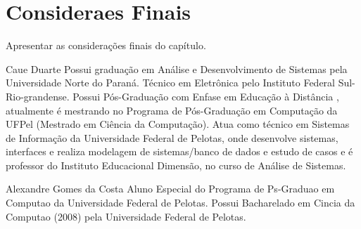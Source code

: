 \documentclass[12pt,a4paper,compsoc]{IEEEtran}
\begin{document}
\section{Consideraes Finais}

Apresentar as considerações finais do capítulo.






\begin{IEEEbiography}{Caue Duarte}
Possui graduação em Análise e Desenvolvimento de Sistemas pela Universidade Norte do Paraná. Técnico em Eletrônica pelo Instituto Federal Sul-Rio-grandense. Possui Pós-Graduação com Enfase em Educação à Distância , atualmente é mestrando no Programa de Pós-Graduação em Computação da UFPel (Mestrado em Ciência da Computação). Atua como técnico em Sistemas de Informação da Universidade Federal de Pelotas, onde desenvolve sistemas, interfaces e realiza modelagem de sistemas/banco de dados e estudo de casos e é professor do Instituto Educacional Dimensão, no curso de Análise de Sistemas. 
\end{IEEEbiography}

\begin{IEEEbiography}{Alexandre Gomes da Costa}
Aluno Especial do Programa de Ps-Graduao em Computao da Universidade Federal de Pelotas. Possui Bacharelado em Cincia da Computao (2008) pela Universidade Federal de Pelotas.
\end{IEEEbiography}
\end{document}

